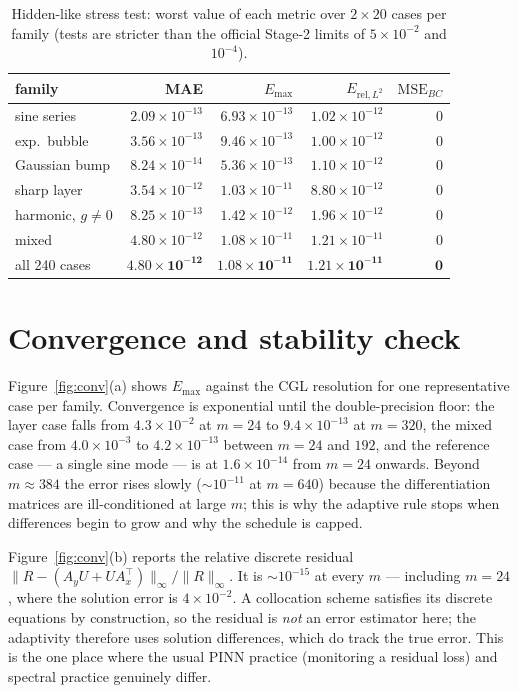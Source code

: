 \documentclass[10pt,a4paper]{article}
\newcommand{\nSeeds}{20}
\newcommand{\nCases}{240}
\newcommand{\wMae}{4.80\times10^{-12}}
\newcommand{\wMax}{1.08\times10^{-11}}
\newcommand{\wRel}{1.21\times10^{-11}}
\newcommand{\wBc}{0}
\begin{document}
\begin{table}[h]
\centering
\caption{Hidden-like stress test: worst value of each metric over
$2\times\nSeeds$ cases per family (tests are stricter than the official Stage-2
limits of $5\times10^{-2}$ and $10^{-4}$).}
\label{tab:stress}
\footnotesize
\begin{tabular}{lrrrr}
\toprule
family & MAE & $E_{\max}$ & $E_{\mathrm{rel},L^2}$ & $\mathrm{MSE}_{BC}$ \\
\midrule
sine series        & $2.09\times10^{-13}$ & $6.93\times10^{-13}$ & $1.02\times10^{-12}$ & $0$ \\
exp.\ bubble       & $3.56\times10^{-13}$ & $9.46\times10^{-13}$ & $1.00\times10^{-12}$ & $0$ \\
Gaussian bump      & $8.24\times10^{-14}$ & $5.36\times10^{-13}$ & $1.10\times10^{-12}$ & $0$ \\
sharp layer        & $3.54\times10^{-12}$ & $1.03\times10^{-11}$ & $8.80\times10^{-12}$ & $0$ \\
harmonic, $g\neq0$ & $8.25\times10^{-13}$ & $1.42\times10^{-12}$ & $1.96\times10^{-12}$ & $0$ \\
mixed              & $4.80\times10^{-12}$ & $1.08\times10^{-11}$ & $1.21\times10^{-11}$ & $0$ \\
\midrule
all \nCases{} cases & $\mathbf{\wMae}$ & $\mathbf{\wMax}$ & $\mathbf{\wRel}$ & $\mathbf{\wBc}$ \\
\bottomrule
\end{tabular}
\end{table}

\section{Convergence and stability check}

Figure~\ref{fig:conv}(a) shows $E_{\max}$ against the CGL resolution for one
representative case per family.  Convergence is exponential until the
double-precision floor: the layer case falls from $4.3\times10^{-2}$ at $m=24$
to $9.4\times10^{-13}$ at $m=320$, the mixed case from $4.0\times10^{-3}$ to
$4.2\times10^{-13}$ between $m=24$ and $192$, and the reference case --- a single
sine mode --- is at $1.6\times10^{-14}$ from $m=24$ onwards.  Beyond
$m\approx384$ the error rises slowly ($\sim10^{-11}$ at $m=640$) because the
differentiation matrices are ill-conditioned at large $m$; this is why the
adaptive rule stops when differences begin to grow and why the schedule is
capped.

Figure~\ref{fig:conv}(b) reports the relative discrete residual
$\|R-(A_yU+UA_x^\top)\|_\infty/\|R\|_\infty$.  It is $\sim10^{-15}$ at every
$m$ --- including $m=24$, where the solution error is $4\times10^{-2}$.  A
collocation scheme satisfies its discrete equations by construction, so the
residual is \emph{not} an error estimator here; the adaptivity therefore uses
solution differences, which do track the true error.  This is the one place
where the usual PINN practice (monitoring a residual loss) and spectral
practice genuinely differ.
\end{document}
